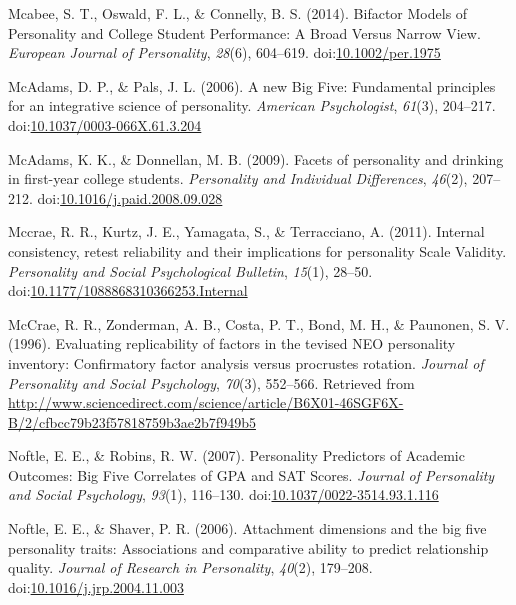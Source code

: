 \documentclass[,man,floatsintext]{apa6}
\begin{document}
\hypertarget{ref-Mcabee2014}{}
Mcabee, S. T., Oswald, F. L., \& Connelly, B. S. (2014). Bifactor Models
of Personality and College Student Performance: A Broad Versus Narrow
View. \emph{European Journal of Personality}, \emph{28}(6), 604--619.
doi:\href{https://doi.org/10.1002/per.1975}{10.1002/per.1975}

\hypertarget{ref-McAdams2006a}{}
McAdams, D. P., \& Pals, J. L. (2006). A new Big Five: Fundamental
principles for an integrative science of personality. \emph{American
Psychologist}, \emph{61}(3), 204--217.
doi:\href{https://doi.org/10.1037/0003-066X.61.3.204}{10.1037/0003-066X.61.3.204}

\hypertarget{ref-McAdams2009}{}
McAdams, K. K., \& Donnellan, M. B. (2009). Facets of personality and
drinking in first-year college students. \emph{Personality and
Individual Differences}, \emph{46}(2), 207--212.
doi:\href{https://doi.org/10.1016/j.paid.2008.09.028}{10.1016/j.paid.2008.09.028}

\hypertarget{ref-Mccrae2011}{}
Mccrae, R. R., Kurtz, J. E., Yamagata, S., \& Terracciano, A. (2011).
Internal consistency, retest reliability and their implications for
personality Scale Validity. \emph{Personality and Social Psychological
Bulletin}, \emph{15}(1), 28--50.
doi:\href{https://doi.org/10.1177/1088868310366253.Internal}{10.1177/1088868310366253.Internal}

\hypertarget{ref-McCrae1996}{}
McCrae, R. R., Zonderman, A. B., Costa, P. T., Bond, M. H., \& Paunonen,
S. V. (1996). Evaluating replicability of factors in the tevised NEO
personality inventory: Confirmatory factor analysis versus procrustes
rotation. \emph{Journal of Personality and Social Psychology},
\emph{70}(3), 552--566. Retrieved from
\url{http://www.sciencedirect.com/science/article/B6X01-46SGF6X-B/2/cfbcc79b23f57818759b3ae2b7f949b5}

\hypertarget{ref-Noftle2007}{}
Noftle, E. E., \& Robins, R. W. (2007). Personality Predictors of
Academic Outcomes: Big Five Correlates of GPA and SAT Scores.
\emph{Journal of Personality and Social Psychology}, \emph{93}(1),
116--130.
doi:\href{https://doi.org/10.1037/0022-3514.93.1.116}{10.1037/0022-3514.93.1.116}

\hypertarget{ref-Noftle2006}{}
Noftle, E. E., \& Shaver, P. R. (2006). Attachment dimensions and the
big five personality traits: Associations and comparative ability to
predict relationship quality. \emph{Journal of Research in Personality},
\emph{40}(2), 179--208.
doi:\href{https://doi.org/10.1016/j.jrp.2004.11.003}{10.1016/j.jrp.2004.11.003}
\end{document}
